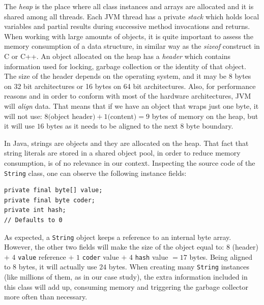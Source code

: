 \documentclass[a4paper,twoside]{article}
\begin{document}
The {\textit{heap} } is the place where all class instances and arrays are allocated and it is shared among all threads.
Each JVM thread has a private {\textit{stack} } which holds local variables and partial results  during successive method invocations and returns.
When working with large amounts of objects, it is quite important to assess the memory consumption of a data structure, in similar way as the {\textit{sizeof} } construct in C or C++.
An object allocated on the heap has a {\textit{header} } which contains information used for locking, garbage collection or the identity of that object.
The size of the header depends on the operating system, and it may be 8 bytes on 32 bit architectures or 16 bytes on 64 bit architectures.
Also, for performance reasons and in order to conform with most of the hardware architectures, JVM will {\textit{align} } data.
That means that if we have an object that wraps just one byte, it will not use: $8 \text{(object header)} + 1 \text{(content)} = 9 $ bytes of memory on the heap, but it will use $16$ bytes as it needs to be aligned to the next $8$ byte boundary.

In Java, strings are objects and they are allocated on the heap.
That fact that string literals are stored in a shared object pool, in order to reduce memory consumption, is of no relevance in our context.
Inspecting the source code of the \texttt{String} class, one can observe the following instance fields:
\begin{small}
\begin{verbatim}
private final byte[] value;
private final byte coder;
private int hash;
// Defaults to 0
\end{verbatim}
\end{small}

As expected, a \texttt{String} object keeps a reference to an internal byte array.
However, the other two fields will make the size of the object equal to: $8$ (header) $+$ $4$ \texttt{value} reference $+$ $1$  \texttt{coder} value $+$ $4$ \texttt{hash} value $= 17$ bytes.
Being aligned to $8$ bytes, it will actually use $24$ bytes.
When creating many \texttt{String} instances (like millions of them, as in our case study), the extra information included in this class will add up, consuming memory and  triggering the garbage collector more often than necessary. 
\end{document}
